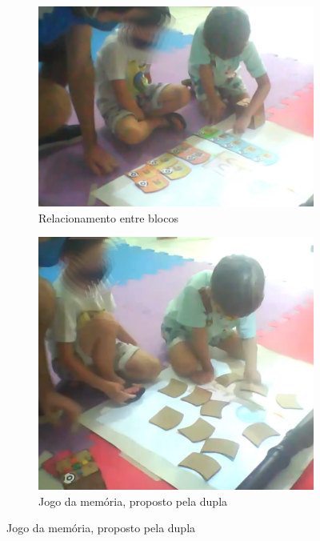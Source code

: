 \begin{figure}[!htbp]
    \begin{center}
    \begin{subfigure}{.5\textwidth}
        \centering
        \includegraphics[width=.9\linewidth,fbox]{figs/relacao_blocos.png}
        \caption{Relacionamento entre blocos}
        \label{fig:relacao_blocos}
    \end{subfigure}%
    \begin{subfigure}{.4\textwidth}
        \centering
        \includegraphics[width=.9\linewidth,fbox]{figs/jogo_memoria.png}
        \caption{Jogo da memória, proposto pela dupla}
        \label{fig:jogo_memoria}
    \end{subfigure}
    \end{center}
    \sourceauthor
    \label{fig:equipe1}
\end{figure}

